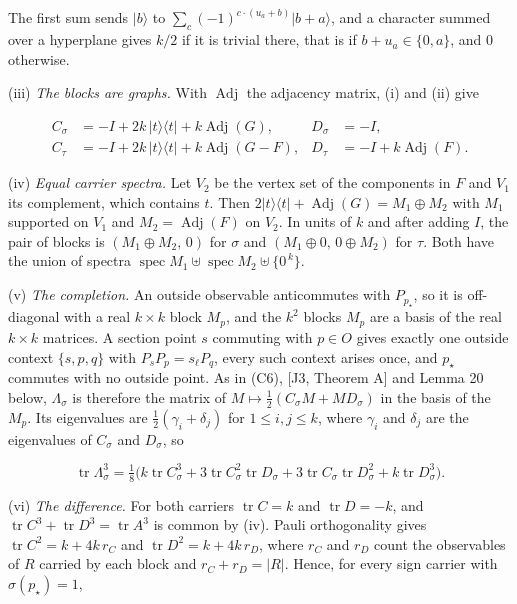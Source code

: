 \documentclass[11pt,a4paper]{article}
\begin{document}
The first sum sends \(|b\rangle\) to \(\sum_c(-1)^{c\cdot(u_a+b)}|b+a\rangle\), and a character summed over a
hyperplane gives \(k/2\) if it is trivial there, that is if \(b+u_a\in\{0,a\}\), and \(0\) otherwise.

(iii) \emph{The blocks are graphs.} With \(\operatorname{Adj}\) the adjacency matrix, (i) and (ii) give

\[\begin{aligned}
C_\sigma&=-I+2k\,|t\rangle\langle t|+k\operatorname{Adj}(G),&D_\sigma&=-I,\\ C_\tau&=-I+2k\,|t\rangle\langle t|+k\operatorname{Adj}(G-F),&D_\tau&=-I+k\operatorname{Adj}(F).
\end{aligned}
\tag{E5}\]

(iv) \emph{Equal carrier spectra.} Let \(V_2\) be the vertex set of the components in \(F\) and \(V_1\) its
complement, which contains \(t\). Then \(2|t\rangle\langle t|+\operatorname{Adj}(G)=M_1\oplus M_2\) with \(M_1\)
supported on \(V_1\) and \(M_2=\operatorname{Adj}(F)\) on \(V_2\). In units of \(k\) and after adding \(I\), the pair of
blocks is \((M_1\oplus M_2,\,0)\) for \(\sigma\) and \((M_1\oplus0,\,0\oplus M_2)\) for \(\tau\). Both have the union of
spectra \(\operatorname{spec}M_1\uplus\operatorname{spec}M_2\uplus\{0^{\,k}\}\).

(v) \emph{The completion.} An outside observable anticommutes with \(P_{p_\star}\), so it is off-diagonal with a
real \(k\times k\) block \(M_p\), and the \(k^2\) blocks \(M_p\) are a basis of the real \(k\times k\) matrices. A
section point \(s\) commuting with \(p\in O\) gives exactly one outside context \(\{s,p,q\}\) with
\(P_sP_p=s_\ell P_q\), every such context arises once, and \(p_\star\) commutes with no outside point. As in
(C6), {[}J3, Theorem A{]} and Lemma 20 below, \(\Lambda_\sigma\) is therefore the matrix of \(M\mapsto\frac12(C_\sigma M+MD_\sigma)\) in the
basis of the \(M_p\). Its eigenvalues are \(\frac12(\gamma_i+\delta_j)\) for \(1\le i,j\le k\), where \(\gamma_i\) and
\(\delta_j\) are the eigenvalues of \(C_\sigma\) and \(D_\sigma\), so

\[\operatorname{tr}\Lambda_\sigma^3=\tfrac18\bigl(k\operatorname{tr}C_\sigma^3+3\operatorname{tr}C_\sigma^2\operatorname{tr}D_\sigma
+3\operatorname{tr}C_\sigma\operatorname{tr}D_\sigma^2+k\operatorname{tr}D_\sigma^3\bigr).
\tag{E6}\]

(vi) \emph{The difference.} For both carriers \(\operatorname{tr}C=k\) and \(\operatorname{tr}D=-k\), and
\(\operatorname{tr}C^3+\operatorname{tr}D^3=\operatorname{tr}A^3\) is common by (iv). Pauli orthogonality gives
\(\operatorname{tr}C^2=k+4k\,r_C\) and \(\operatorname{tr}D^2=k+4k\,r_D\), where \(r_C\) and \(r_D\) count the
observables of \(R\) carried by each block and \(r_C+r_D=|R|\). Hence, for every sign carrier with
\(\sigma(p_\star)=1\),
\end{document}
